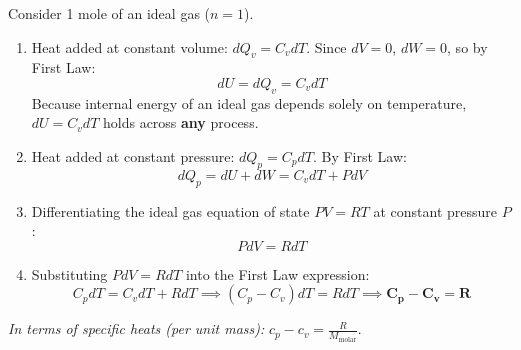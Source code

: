 \documentclass[10pt,a4paper]{article}
\begin{document}
\begin{formulabox}[Mayer's Relation Derivation: $C_p - C_v = R$]
Consider 1 mole of an ideal gas ($n=1$).
\begin{enumerate}
  \item Heat added at constant volume: $dQ_v = C_v dT$. Since $dV = 0$, $dW = 0$, so by First Law:
  \begin{equation}
    dU = dQ_v = C_v dT
  \end{equation}
  Because internal energy of an ideal gas depends solely on temperature, $dU = C_v dT$ holds across \textbf{any} process.
  \item Heat added at constant pressure: $dQ_p = C_p dT$. By First Law:
  \begin{equation}
    dQ_p = dU + dW = C_v dT + P dV
  \end{equation}
  \item Differentiating the ideal gas equation of state $P V = R T$ at constant pressure $P$:
  \begin{equation}
    P dV = R dT
  \end{equation}
  \item Substituting $P dV = R dT$ into the First Law expression:
  \begin{equation}
    C_p dT = C_v dT + R dT \implies (C_p - C_v) dT = R dT \implies \mathbf{C_p - C_v = R}
  \end{equation}
\end{enumerate}
\textit{In terms of specific heats (per unit mass):} $c_p - c_v = \frac{R}{M_{\text{molar}}}$.
\end{formulabox}
\end{document}
